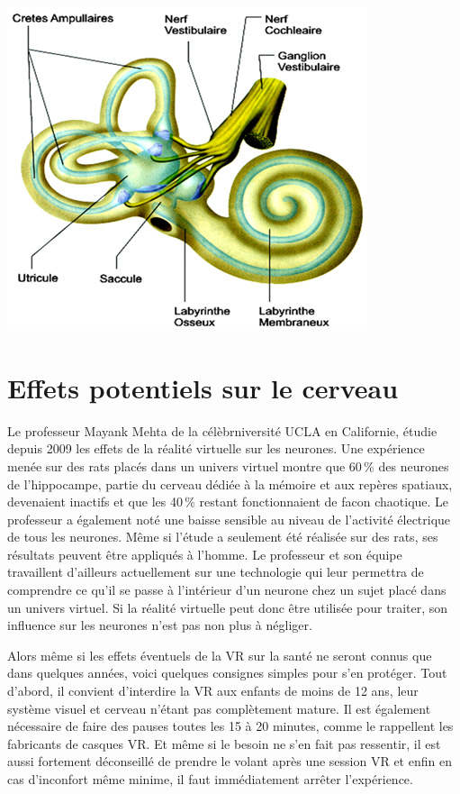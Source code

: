 \documentclass[12pt, a4paper]{report}
\begin{document}
\begin{center}
\includegraphics[scale=0.5]{oreille.jpg}
\end{center}

\section[Cerveau]{Effets potentiels sur le cerveau}

Le professeur Mayank Mehta de la célèbrniversité UCLA en Californie, étudie depuis 2009 les effets de la réalité virtuelle sur les neurones. Une expérience menée sur des rats placés dans un univers virtuel montre que 60\,\% des neurones de l'hippocampe, partie du cerveau dédiée à la mémoire et aux repères spatiaux, devenaient inactifs et que les 40\,\% restant fonctionnaient de facon chaotique. Le professeur a également noté une baisse sensible au niveau de l'activité électrique de tous les neurones. Même si l'étude a seulement été réalisée sur des rats, ses résultats peuvent être appliqués à l'homme. Le professeur et son équipe travaillent d'ailleurs actuellement sur une technologie qui leur permettra de comprendre ce qu'il se passe à l'intérieur d'un neurone chez un sujet placé dans un univers virtuel. Si la réalité virtuelle peut donc être utilisée pour  traiter, son influence sur les neurones n'est pas non plus à négliger.

Alors même si les effets éventuels de la VR sur la santé ne seront connus que dans quelques années, voici quelques consignes simples pour  s'en protéger. Tout d'abord, il convient d'interdire la VR aux enfants de moins de 12 ans, leur système visuel et cerveau n'étant pas complètement mature. Il est également nécessaire de faire des pauses toutes les 15 à 20 minutes, comme le rappellent les fabricants de casques VR. Et même si le besoin ne s'en fait pas ressentir, il est aussi fortement déconseillé de prendre le volant après une session VR et enfin en cas d'inconfort même minime, il faut immédiatement arrêter l'expérience.
\end{document}
